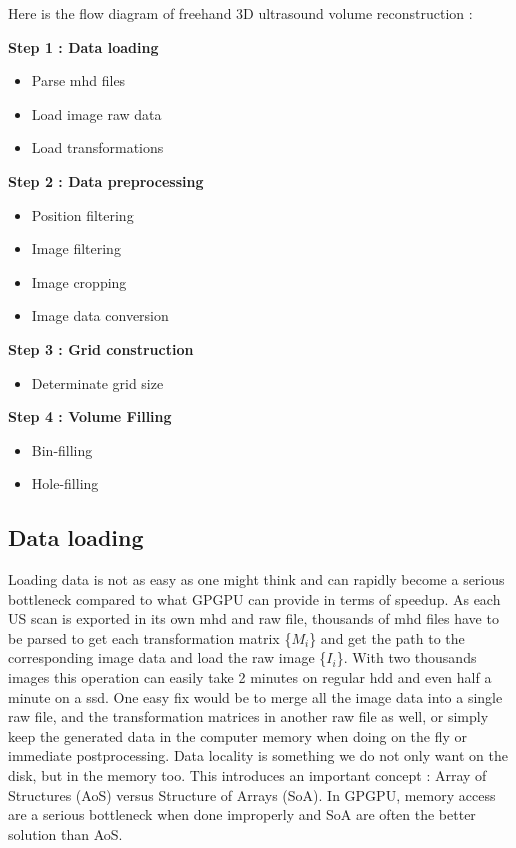 \documentclass[12pt,journal,compsoc]{IEEEtran}
\begin{document}
\newpage
Here is the flow diagram of freehand 3D ultrasound volume reconstruction :
\begin{framed}
\noindent\textbf{Step 1 : Data loading}
\begin{itemize}
	\item Parse mhd files
	\item Load image raw data
	\item Load transformations
\end{itemize}
\textbf{Step 2 : Data preprocessing}
\begin{itemize}
	\item Position filtering
	\item Image filtering
	\item Image cropping
	\item Image data conversion
\end{itemize}
\textbf{Step 3 : Grid construction}
\begin{itemize}
	\item Determinate grid size
\end{itemize}
\textbf{Step 4 : Volume Filling}
\begin{itemize}
	\item Bin-filling
	\item Hole-filling
\end{itemize}
\end{framed}

\subsection{Data loading}

Loading data is not as easy as one might think and can rapidly become a serious bottleneck compared to what GPGPU can provide in terms of speedup. 
As each US scan is exported in its own mhd and raw file, thousands of mhd files have to be parsed to get each transformation matrix \{$M_i$\} and get the path to the corresponding image data and load the raw image \{$I_i$\}.  
With two thousands images this operation can easily take 2 minutes on regular \ac{hdd} and even half a minute on a \ac{ssd}.
One easy fix would be to merge all the image data into a single raw file, and the transformation matrices in another raw file as well, or simply keep the generated data in the computer memory when doing on the fly or immediate postprocessing.
Data locality is something we do not only want on the disk, but in the memory too. This introduces an important concept : Array of Structures (AoS) versus Structure of Arrays (SoA). In GPGPU, memory access are a serious bottleneck when done improperly and SoA are often the better solution than AoS. 
\end{document}
